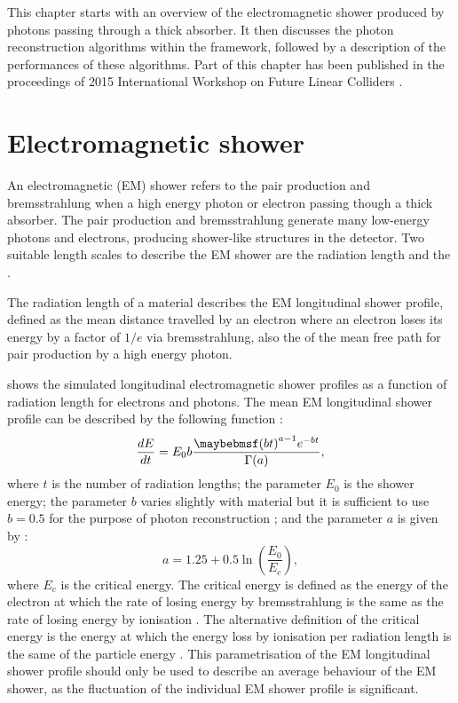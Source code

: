 This chapter starts with an overview of the electromagnetic shower produced by photons passing through a thick absorber. It then discusses the photon reconstruction algorithms within the \pandora framework, followed by a description of the performances of these algorithms.  Part of this chapter has been published in the proceedings of 2015 International Workshop on Future Linear Colliders \cite{Xu:2016rcz}.




\section{Electromagnetic shower}
\label{sec:photonEMshower}
An electromagnetic (EM) shower refers to the pair production and bremsstrahlung when a high energy photon or electron passing though a thick absorber. The pair production and bremsstrahlung generate many low-energy photons and electrons, producing shower-like  structures in the detector. Two suitable length scales to describe the EM shower are the radiation length and the \RM \cite{PhysRev.149.201,Bathow:1970dn}.

The radiation length of a material describes the EM longitudinal  shower profile, defined as the mean distance travelled by an electron where an electron loses its energy by a factor of $1/e$ via bremsstrahlung, also the  of the mean free path  for pair production by a high energy photon\cite{segre1977nuclei}.


 shows the simulated longitudinal electromagnetic shower profiles as a function of radiation length for electrons and photons. The mean EM longitudinal shower profile can be described by the following function \cite{Longo:1975wb} :
\begin{equation}
\frac{dE}{dt} = E_0 b \frac{\parenths{bt}^{a-1}e^{-bt}}{\Gamma(a)},
\label{eq:photonEMshower}
\end{equation}
where $t$ is the number of radiation lengths; the parameter $E_0$ is the shower energy; the parameter $b$ varies slightly with material but it is sufficient to use $b = 0.5$ for the purpose of photon reconstruction \cite{Agashe:2014kda}; and the parameter $a$ is given by \cite{Thomson:2009rp}:
\begin{equation}
a = 1.25 + 0.5\ln\left(\frac{E_0}{E_c}\right),
\end{equation}
where $E_c$ is the critical energy. The critical energy is defined as the energy of the electron at which the rate of losing energy by bremsstrahlung is the same as the rate of losing energy by ionisation \cite{1964NASSP3012.....B}. The alternative definition of the critical energy is the energy at which the energy loss by ionisation per radiation length is the same of the particle energy \cite{rossi1952high}. This parametrisation of the EM longitudinal shower profile should only be used to describe an average behaviour of the EM shower, as the fluctuation of the individual EM shower profile is significant.

